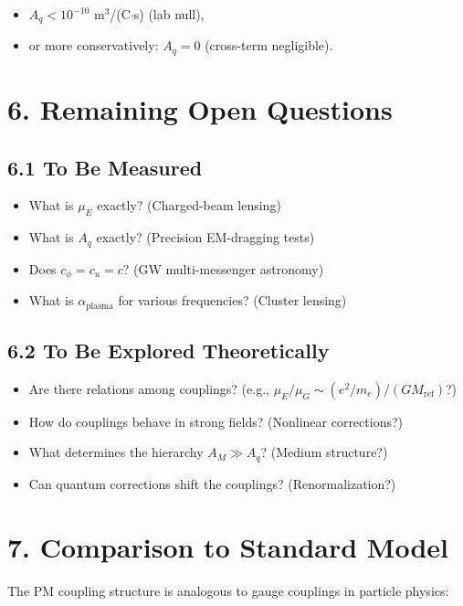 \documentclass{article}
\begin{document}
\begin{itemize}
    \item $A_q < 10^{-10}$ m$^3$/(C$\cdot$s) (lab null),
    \item or more conservatively: $A_q = 0$ (cross-term negligible).
\end{itemize}

\section*{6. Remaining Open Questions}

\subsection*{6.1 To Be Measured}

\begin{itemize}
    \item What is $\mu_E$ exactly? (Charged-beam lensing)
    \item What is $A_q$ exactly? (Precision EM-dragging tests)
    \item Does $c_\phi = c_u = c$? (GW multi-messenger astronomy)
    \item What is $\alpha_{\text{plasma}}$ for various frequencies? (Cluster lensing)
\end{itemize}

\subsection*{6.2 To Be Explored Theoretically}

\begin{itemize}
    \item Are there relations among couplings? (e.g., $\mu_E / \mu_G \sim (e^2/m_e) / (G M_{\text{ref}})$?)
    \item How do couplings behave in strong fields? (Nonlinear corrections?)
    \item What determines the hierarchy $A_M \gg A_q$? (Medium structure?)
    \item Can quantum corrections shift the couplings? (Renormalization?)
\end{itemize}

\section*{7. Comparison to Standard Model}

The PM coupling structure is analogous to gauge couplings in particle physics:
\end{document}
